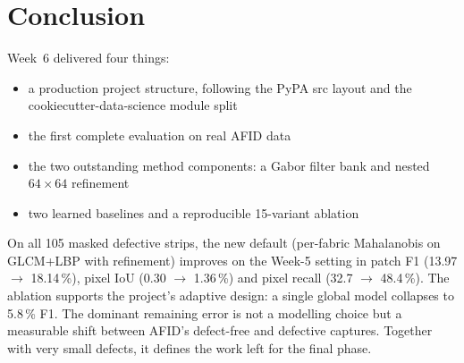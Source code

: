 \documentclass[11pt,a4paper]{article}
\begin{document}
\section*{Conclusion}
Week~6 delivered four things:
\begin{itemize}
  \item a production project structure, following the PyPA src layout and the cookiecutter-data-science module split
  \item the first complete evaluation on real AFID data
  \item the two outstanding method components: a Gabor filter bank and nested $64\times64$ refinement
  \item two learned baselines and a reproducible 15-variant ablation
\end{itemize}
On all 105 masked defective strips, the new default (per-fabric Mahalanobis on GLCM+LBP with refinement) improves on the Week-5 setting in patch F1 (13.97 $\rightarrow$ 18.14\,\%), pixel IoU (0.30 $\rightarrow$ 1.36\,\%) and pixel recall (32.7 $\rightarrow$ 48.4\,\%). The ablation supports the project's adaptive design: a single global model collapses to 5.8\,\% F1. The dominant remaining error is not a modelling choice but a measurable shift between AFID's defect-free and defective captures. Together with very small defects, it defines the work left for the final phase.
\end{document}
